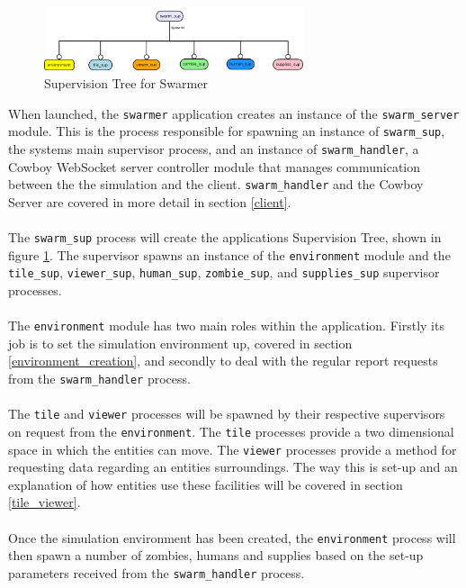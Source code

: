 \documentclass[10pt, a4paper, conference, compsocconf]{IEEEtran}
\begin{document}
\begin{figure}[h]
  \centering
  \includegraphics[width=3in]{../img/supervisor.png}
\caption{Supervision Tree for Swarmer}
    \label{fig:sup_tree}
\end{figure}

When launched, the \verb+swarmer+ application creates an instance of the \verb+swarm_server+ module. This is the process responsible for spawning an instance of \verb+swarm_sup+, the systems main supervisor process, and an instance of \verb+swarm_handler+, a Cowboy WebSocket server \cite{cowboy} controller module that manages communication between the the simulation and the client. \verb+swarm_handler+ and the Cowboy Server are covered in more detail in section \ref{client}.\\
\\
The \verb+swarm_sup+ process will create the applications Supervision Tree, shown in figure \ref{fig:sup_tree}. The supervisor spawns an instance of the \verb+environment+ module and the \verb+tile_sup+, \verb+viewer_sup+, \verb+human_sup+, \verb+zombie_sup+, and \verb+supplies_sup+ supervisor processes.\\
\\
The \verb+environment+ module has two main roles within the application. Firstly its job is to set the simulation environment up, covered in section \ref{environment_creation}, and secondly to deal with the regular report requests from the \verb+swarm_handler+ process.\\
\\
The \verb+tile+ and \verb+viewer+ processes will be spawned by their respective supervisors on request from the \verb+environment+. The \verb+tile+ processes provide a two dimensional space in which the entities can move. The \verb+viewer+ processes provide a method for requesting data regarding an entities surroundings. The way this is set-up and an explanation of how entities use these facilities will be covered in section \ref{tile_viewer}.\\
\\
Once the simulation environment has been created, the \verb+environment+ process will then spawn a number of zombies, humans and supplies based on the set-up parameters received from the \verb+swarm_handler+ process.\\
\end{document}

